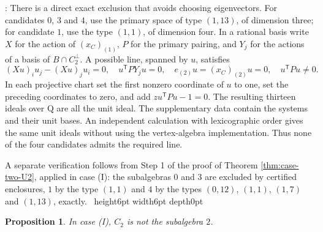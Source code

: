 \documentclass[leqno]{article}
\newcommand{\Q}{\mathrm{Q}}
\newcommand{\qed}{\hfill \vrule height6pt  width6pt depth0pt}
\newtheorem{prop}[thm]{Proposition}
\newenvironment{proof}[1][]{\noindent {\it Proof #1} : }{\hbox{~}\qed
\smallskip
}
\numberwithin{equation}{section}
\begin{document}
\begin{proof}
There is a direct exact exclusion that avoids choosing eigenvectors. For candidates $0$, $3$ and $4$, use the primary space of type $(1,13)$, of dimension three; for candidate $1$, use the type $(1,1)$, of dimension four. In a rational basis write $X$ for the action of $(x_C)_{(1)}$, $P$ for the primary pairing, and $Y_j$ for the actions of a basis of $B \cap C_2^\perp$. A possible line, spanned by $u$, satisfies
\[
(Xu)_i u_j-(Xu)_j u_i = 0, \quad u^{\mathsf T}P Y_j u = 0,
\quad e_{(2)}u = (x_C)_{(2)}u = 0, \quad u^{\mathsf T}Pu \neq 0.
\]
In each projective chart set the first nonzero coordinate of $u$ to one, set the preceding coordinates to zero, and add $z u^{\mathsf T}Pu-1 = 0$. The resulting thirteen ideals over $\Q$ are all the unit ideal. The supplementary data contain the systems and their unit bases. An independent calculation with lexicographic order gives the same unit ideals without using the vertex-algebra implementation. Thus none of the four candidates admits the required line.

A separate verification follows from Step 1 of the proof of Theorem \ref{thm:case-two-U2}, applied in case (I): the subalgebras $0$ and $3$ are excluded by certified enclosures, $1$ by the type $(1,1)$ and $4$ by the types $(0,12)$, $(1,1)$, $(1,7)$ and $(1,13)$, exactly.
\end{proof}

\begin{prop}
\label{prop:case-one-two}
In case (I), $C_2$ is not the subalgebra $2$.
\end{prop}
\end{document}
